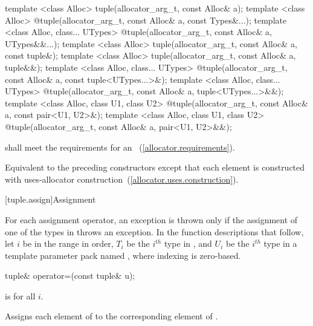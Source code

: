 %
\begin{itemdecl}
template <class Alloc>
  tuple(allocator_arg_t, const Alloc& a);
template <class Alloc>
  @\EXPLICIT@ tuple(allocator_arg_t, const Alloc& a, const Types&...);
template <class Alloc, class... UTypes>
  @\EXPLICIT@ tuple(allocator_arg_t, const Alloc& a, UTypes&&...);
template <class Alloc>
  tuple(allocator_arg_t, const Alloc& a, const tuple&);
template <class Alloc>
  tuple(allocator_arg_t, const Alloc& a, tuple&&);
template <class Alloc, class... UTypes>
  @\EXPLICIT@ tuple(allocator_arg_t, const Alloc& a, const tuple<UTypes...>&);
template <class Alloc, class... UTypes>
  @\EXPLICIT@ tuple(allocator_arg_t, const Alloc& a, tuple<UTypes...>&&);
template <class Alloc, class U1, class U2>
  @\EXPLICIT@ tuple(allocator_arg_t, const Alloc& a, const pair<U1, U2>&);
template <class Alloc, class U1, class U2>
  @\EXPLICIT@ tuple(allocator_arg_t, const Alloc& a, pair<U1, U2>&&);
\end{itemdecl}

\begin{itemdescr}
\pnum
\requires {} shall meet the requirements for an
~(\ref{allocator.requirements}).

\pnum
\effects Equivalent to the preceding constructors except that each element is constructed with
uses-allocator construction~(\ref{allocator.uses.construction}).
\end{itemdescr}

[tuple.assign]{Assignment}

\pnum
For each  assignment operator, an exception is thrown only if the
assignment of one of the types in  throws an exception.
In the function descriptions that follow, let $i$ be in the range 
in order, $T_i$ be the $i^{th}$ type in , and $U_i$ be the $i^{th}$ type in a
template parameter pack named , where indexing is zero-based.

%
%
\begin{itemdecl}
tuple& operator=(const tuple& u);
\end{itemdecl}

\begin{itemdescr}
\pnum
\requires {} is  for all $i$.

\pnum
\effects  Assigns each element of  to the corresponding
element of .

\pnum
\returns  {}
\end{itemdescr}

